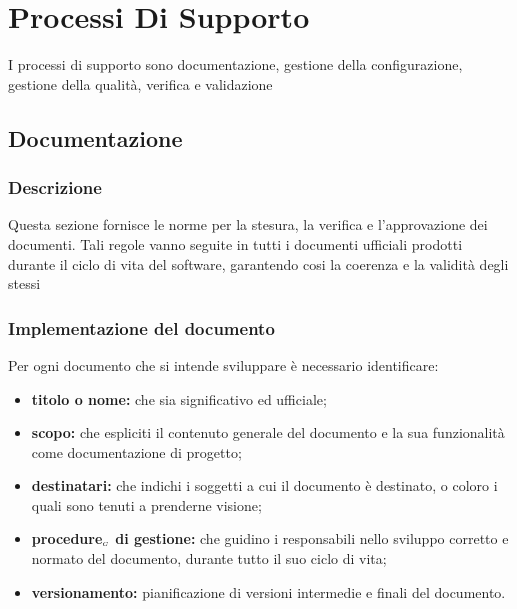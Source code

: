 \chapter{Processi Di Supporto}\label{ProcessiDiSupporto}
I processi di supporto sono documentazione, gestione della configurazione, gestione della qualità, verifica e validazione
\section{Documentazione}\label{ProcessiDiSupportoDocumentazione}
\subsection{Descrizione}\label{ProcessiDiSupportoDocumentazioneDescrizione}
Questa sezione fornisce le norme per la stesura, la verifica e l'approvazione dei documenti. Tali regole vanno seguite in tutti i documenti ufficiali prodotti durante il ciclo di vita del software, garantendo cosi la coerenza e la validità degli stessi
\subsection{Implementazione del documento}\label{ProcessiDiSupportoDocumentazioneImplementazioneDelDocumento}
 Per ogni documento che si intende sviluppare è necessario identificare:
\begin{itemize}
\item \textbf {titolo o nome:} che sia significativo ed ufficiale;
	\item \textbf {scopo:} che espliciti il contenuto generale del documento e la sua funzionalità come 		documentazione di progetto;
		\item \textbf {destinatari:} che indichi i soggetti a cui il documento è destinato, o coloro i quali sono tenuti a prenderne visione;
			\item \textbf {procedure$_{\scaleto{G}{3pt}}$ di gestione:} che guidino i responsabili nello sviluppo corretto e normato del documento, durante tutto il suo ciclo di vita;
				\item \textbf {versionamento:} pianificazione di versioni intermedie e finali del documento.
\end{itemize}
